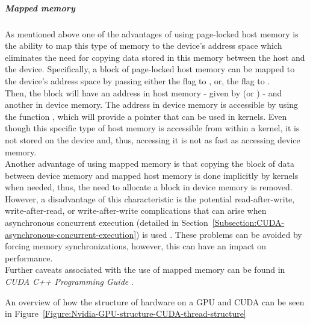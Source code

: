 \subparagraph{Mapped memory}
As mentioned above one of the advantages of using page-locked host memory is the ability to map this type of memory to the device's address space which eliminates the need for copying data stored in this memory between the host and the device. Specifically, a block of page-locked host memory can be mapped to the device's address space by passing either the  flag to , or, the  flag to  \cite{NVIDIAMay2022}. \\
Then, the block will have an address in host memory - given by  (or ) - and another in device memory. The address in device memory is accessible by using the function , which will provide a pointer that can be used in kernels. Even though this specific type of host memory is accessible from within a kernel, it is not stored on the device and, thus, accessing it is not as fast as accessing device memory. \\
Another advantage of using mapped memory is that copying the block of data between device memory and mapped host memory is done implicitly by kernels when needed, thus, the need to allocate a block in device memory is removed. However, a disadvantage of this characteristic is the potential read-after-write, write-after-read, or write-after-write complications that can arise when asynchronous concurrent execution (detailed in Section~\ref{Subsection:CUDA-asynchronous-concurrent-execution}) is used \cite{NVIDIAMay2022}. These problems can be avoided by forcing memory synchronizations, however, this can have an impact on performance. \\
Further caveats associated with the use of mapped memory can be found in \emph{CUDA C++ Programming Guide} \cite{NVIDIAMay2022}.

\par An overview of how the structure of hardware on a GPU and CUDA can be seen in Figure~\ref{Figure:Nvidia-GPU-structure-CUDA-thread-structure}

